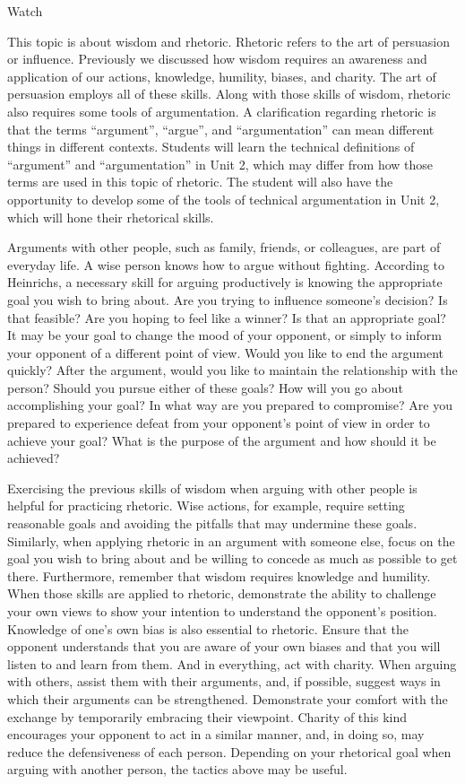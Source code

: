 \documentclass[
]{book}
\begin{document}
Watch

This topic is about wisdom and rhetoric. Rhetoric refers to the art of persuasion or influence. Previously we discussed how wisdom requires an awareness and application of our actions, knowledge, humility, biases, and charity. The art of persuasion employs all of these skills. Along with those skills of wisdom, rhetoric also requires some tools of argumentation. A clarification regarding rhetoric is that the terms ``argument'', ``argue'', and ``argumentation'' can mean different things in different contexts. Students will learn the technical definitions of ``argument'' and ``argumentation'' in Unit 2, which may differ from how those terms are used in this topic of rhetoric. The student will also have the opportunity to develop some of the tools of technical argumentation in Unit 2, which will hone their rhetorical skills.

Arguments with other people, such as family, friends, or colleagues, are part of everyday life. A wise person knows how to argue without fighting. According to Heinrichs, a necessary skill for arguing productively is knowing the appropriate goal you wish to bring about. Are you trying to influence someone's decision? Is that feasible? Are you hoping to feel like a winner? Is that an appropriate goal? It may be your goal to change the mood of your opponent, or simply to inform your opponent of a different point of view. Would you like to end the argument quickly? After the argument, would you like to maintain the relationship with the person? Should you pursue either of these goals? How will you go about accomplishing your goal? In what way are you prepared to compromise? Are you prepared to experience defeat from your opponent's point of view in order to achieve your goal? What is the purpose of the argument and how should it be achieved?

Exercising the previous skills of wisdom when arguing with other people is helpful for practicing rhetoric. Wise actions, for example, require setting reasonable goals and avoiding the pitfalls that may undermine these goals. Similarly, when applying rhetoric in an argument with someone else, focus on the goal you wish to bring about and be willing to concede as much as possible to get there. Furthermore, remember that wisdom requires knowledge and humility. When those skills are applied to rhetoric, demonstrate the ability to challenge your own views to show your intention to understand the opponent's position. Knowledge of one's own bias is also essential to rhetoric. Ensure that the opponent understands that you are aware of your own biases and that you will listen to and learn from them. And in everything, act with charity. When arguing with others, assist them with their arguments, and, if possible, suggest ways in which their arguments can be strengthened. Demonstrate your comfort with the exchange by temporarily embracing their viewpoint. Charity of this kind encourages your opponent to act in a similar manner, and, in doing so, may reduce the defensiveness of each person. Depending on your rhetorical goal when arguing with another person, the tactics above may be useful.
\end{document}
